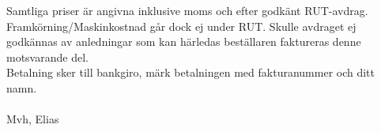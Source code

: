 \documentclass[a4paper,11pt]{extarticle}
\newcommand{\changefont}{%
        \fontsize{9}{11}\selectfont
    }
\begin{document}
\renewcommand\arraystretch{1}

\vspace{2em}
Samtliga priser är angivna inklusive moms och efter godkänt RUT-avdrag. Framkörning/Maskinkostnad går dock ej under RUT.
Skulle avdraget ej godkännas av anledningar som kan härledas beställaren faktureras denne motsvarande del. \\

Betalning sker till bankgiro, märk betalningen med fakturanummer och ditt namn. \\
~\\

Mvh, Elias

\end{document}

